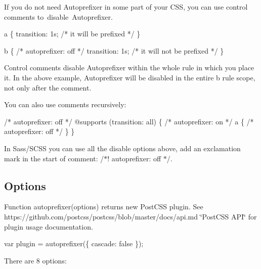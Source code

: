 If you do not need Autoprefixer in some part of your C\+SS, you can use control comments to disable \+Autoprefixer.


\begin{DoxyCode}
a \{
    transition: 1s; /* it will be prefixed */
\}

b \{
    /* autoprefixer: off */
    transition: 1s; /* it will not be prefixed */
\}
\end{DoxyCode}


Control comments disable Autoprefixer within the whole rule in which you place it. In the above example, Autoprefixer will be disabled in the entire {\ttfamily b} rule scope, not only after the comment.

You can also use comments recursively\+:


\begin{DoxyCode}
/* autoprefixer: off */
@supports (transition: all) \{
    /* autoprefixer: on */
    a \{
        /* autoprefixer: off */
    \}
\}
\end{DoxyCode}


In Sass/\+S\+C\+SS you can use all the disable options above, add an exclamation mark in the start of comment\+: {\ttfamily /$\ast$! autoprefixer\+: off $\ast$/}.

\subsection*{Options}

Function {\ttfamily autoprefixer(options)} returns new Post\+C\+SS plugin. See https\+://github.com/postcss/postcss/blob/master/docs/api.\+md \char`\"{}\+Post\+C\+S\+S A\+P\+I\char`\"{} for plugin usage documentation.


\begin{DoxyCode}
var plugin = autoprefixer(\{ cascade: false \});
\end{DoxyCode}


There are 8 options\+:


